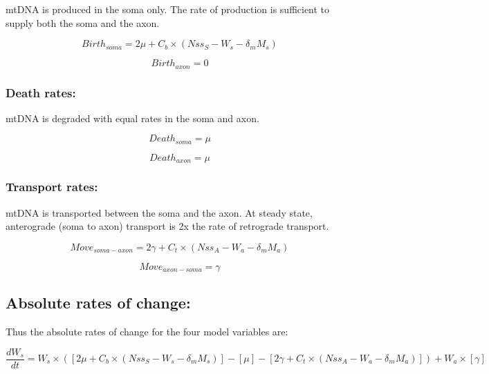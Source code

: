 \documentclass[]{article}
\begin{document}
	mtDNA is produced in the soma only. The rate of production is sufficient to supply both the soma and the axon.

	\begin{equation}
		Birth_{soma} = 2\mu + C_b \times (Nss_{S}-W_s-\delta_m M_s) 
	\end{equation}
	
	\begin{equation}
		Birth_{axon} = 0
	\end{equation}
	
	\subsubsection{Death rates:}
	
	mtDNA is degraded with equal rates in the soma and axon. 
	
	\begin{equation}
		Death_{soma} = \mu
	\end{equation}
	
	\begin{equation}
		Death_{axon} = \mu
	\end{equation}
	
	\subsubsection{Transport rates:}
	
	mtDNA is transported between the soma and the axon. At steady state, anterograde (soma to axon) transport is 2x the rate of retrograde transport. 
	
	\begin{equation}
		Move_{soma-axon} = 2\gamma + C_t \times (Nss_{A}-W_a-\delta_m M_a) 
	\end{equation}
	
	\begin{equation}
		Move_{axon-soma} = \gamma
	\end{equation}
	
	\subsection{Absolute rates of change:}

	Thus the absolute rates of change for the four model variables are:

	\begin{equation}
		\frac{d W_s}{d t} = W_s \times \left( [2\mu + C_b \times (Nss_{S}-W_s-\delta_m M_s) ] - [\mu] - [2\gamma + C_t \times (Nss_A - W_a - \delta_m M_a)]\right) + W_a \times [\gamma] 
	\end{equation}
	
\end{document}
